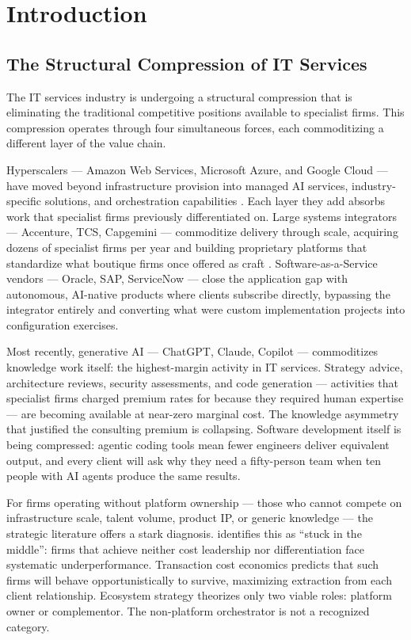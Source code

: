 \section{Introduction}

\subsection{The Structural Compression of IT Services}

The IT services industry is undergoing a structural compression that is eliminating the traditional competitive positions available to specialist firms. This compression operates through four simultaneous forces, each commoditizing a different layer of the value chain.

Hyperscalers --- Amazon Web Services, Microsoft Azure, and Google Cloud --- have moved beyond infrastructure provision into managed AI services, industry-specific solutions, and orchestration capabilities \citep{Jacobides2022}. Each layer they add absorbs work that specialist firms previously differentiated on. Large systems integrators --- Accenture, TCS, Capgemini --- commoditize delivery through scale, acquiring dozens of specialist firms per year and building proprietary platforms that standardize what boutique firms once offered as craft \citep{Gawer2022DigitalAge}. Software-as-a-Service vendors --- Oracle, SAP, ServiceNow --- close the application gap with autonomous, AI-native products where clients subscribe directly, bypassing the integrator entirely and converting what were custom implementation projects into configuration exercises.

Most recently, generative AI --- ChatGPT, Claude, Copilot --- commoditizes knowledge work itself: the highest-margin activity in IT services. Strategy advice, architecture reviews, security assessments, and code generation --- activities that specialist firms charged premium rates for because they required human expertise --- are becoming available at near-zero marginal cost. The knowledge asymmetry that justified the consulting premium is collapsing. Software development itself is being compressed: agentic coding tools mean fewer engineers deliver equivalent output, and every client will ask why they need a fifty-person team when ten people with AI agents produce the same results.

For firms operating without platform ownership --- those who cannot compete on infrastructure scale, talent volume, product IP, or generic knowledge --- the strategic literature offers a stark diagnosis. \citet{Porter1985} identifies this as ``stuck in the middle'': firms that achieve neither cost leadership nor differentiation face systematic underperformance. Transaction cost economics \citep{Williamson1991} predicts that such firms will behave opportunistically to survive, maximizing extraction from each client relationship. Ecosystem strategy \citep{Gawer2014, Jacobides2018} theorizes only two viable roles: platform owner or complementor. The non-platform orchestrator is not a recognized category.

